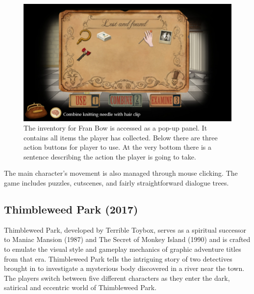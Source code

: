 \begin{figure}[H]
\centering
\includegraphics[width=1.\linewidth]{img/Fran_Bow.png}
\caption{The inventory for Fran Bow is accessed as a pop-up panel. It contains all items the player has collected. Below there are three action buttons for player to use. At the very bottom there is a sentence describing the action the player is going to take.}
\label{fig:FranBow}
\end{figure}

The main character's movement is also managed through mouse clicking. The game includes puzzles, cutscenes, and fairly straightforward dialogue trees.

\subsection{Thimbleweed Park (2017)}

Thimbleweed Park, developed by Terrible Toybox, serves as a spiritual successor to Maniac Mansion (1987) and The Secret of Monkey Island (1990) and is crafted to emulate the visual style and gameplay mechanics of graphic adventure titles from that era. Thimbleweed Park tells the intriguing story of two detectives brought in to investigate a mysterious body discovered in a river near the town. The players switch between five different characters as they enter the dark, satirical and eccentric world of Thimbleweed Park\cite{Matulef2014}.



